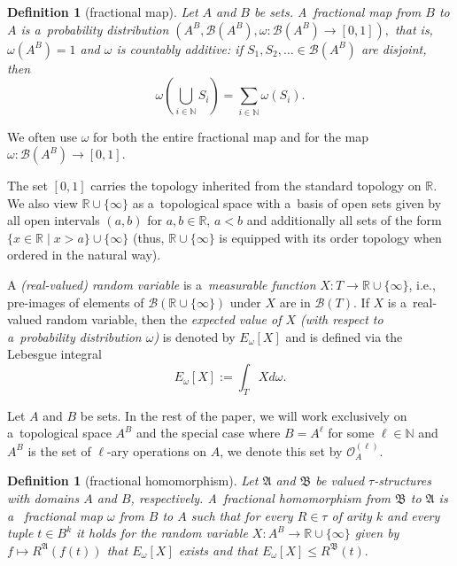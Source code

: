 \documentclass[preprint,12pt]{elsarticle}
\newcommand{\N}{\mathbb N}
\newcommand{\bA}{{\mathfrak A}}
\newcommand{\bB}{{\mathfrak B}}
\newtheorem{definition}[theorem]{Definition}
\begin{document}
\begin{definition}[fractional map]
Let $A$ and $B$ be sets. A~\emph{fractional map} from $B$ to $A$ is a~probability distribution 
$(A^B, \mathcal{B}(A^B),\omega \colon \mathcal{B}(A^B) \to [0,1]),$
that is, $\omega(A^B) = 1$ and $\omega$ is countably additive: if $S_1, S_2,\dots \in \mathcal{B}(A^B)$ are disjoint, then \[\omega\left(\bigcup_{i \in {\mathbb N}} S_i\right) = \sum_{i \in {\mathbb N}} \omega(S_i).\]
\end{definition}

We often use $\omega$ for both the entire fractional map and for the map $\omega \colon \mathcal{B}(A^B) \to [0,1]$.

The set $[0,1]$ carries the topology inherited from  the standard topology on ${\mathbb R}$. We also view ${\mathbb R} \cup \{\infty\}$ as a~topological space with a~basis of open sets given by
all open intervals
$(a,b)$ for $a,b \in {\mathbb R}$, $a<b$ and additionally all sets of the form $\{x \in {\mathbb R} \mid x > a\} \cup \{\infty\}$ (thus, $\mathbb{R} \cup \{ \infty \}$ is equipped with its order topology when ordered in the natural way).

A \emph{(real-valued) random variable} is a~\emph{measurable function} $X \colon T \to {\mathbb R} \cup \{\infty\}$, i.e., pre-images of elements of $\mathcal{B}({\mathbb R} \cup \{\infty\})$ under $X$ are in $\mathcal{B}(T)$. 
If $X$ is a~real-valued random variable, then the \emph{expected value of $X$ (with respect to a~probability distribution $\omega$)} is denoted by $E_\omega[X]$ and is defined 
via the Lebesgue integral 
\[ E_\omega[X] := \int_T X d \omega. \]


Let $A$ and $B$ be sets. In the rest of the paper, we will work exclusively on a~topological space $A^B$ and the special case where $B=A^\ell$ for some $\ell \in \N$ and $A^B$ is the set of $\ell$-ary operations on $A$, we denote this set by ${\mathscr O}_A^{(\ell)}$.

\begin{definition}[fractional homomorphism]\label{def:frac-hom}
Let $\bA$ and $\bB$ be valued $\tau$-structures with domains $A$ and $B$, respectively. A~\emph{fractional homomorphism} from
$\bB$ to $\bA$ is a~
fractional map $\omega$ from $B$ to $A$
 such that for every $R \in \tau$ of arity $k$ 
and every tuple $t \in B^k$ 
it holds for the random variable $X \colon A^B \rightarrow \mathbb{R}\cup\{\infty\}$ given  by
$f \mapsto R^{\bA}(f(t))$ that 
$E_\omega[X]$
exists and that 
$E_\omega[X]
\leq R^{\bB}(t).$
\end{definition}
\end{document}
